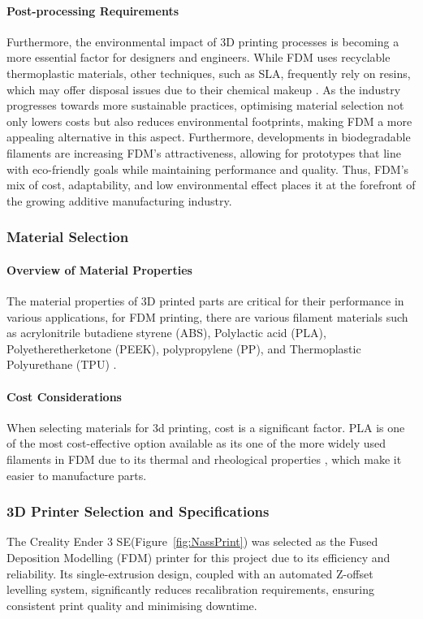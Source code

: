 \paragraph{Post-processing Requirements}

Furthermore, the environmental impact of 3D printing processes is becoming a more essential factor for designers and engineers. 
While FDM uses recyclable thermoplastic materials, other techniques, such as SLA, frequently rely on resins, which may offer disposal issues due to their chemical makeup \cite{RefWorks:yankov2017comparison}. 
As the industry progresses towards more sustainable practices, optimising material selection not only lowers costs but also reduces environmental footprints, making FDM a more appealing alternative in this aspect. 
Furthermore, developments in biodegradable filaments are increasing FDM's attractiveness, allowing for prototypes that line with eco-friendly goals while maintaining performance and quality. 
Thus, FDM's mix of cost, adaptability, and low environmental effect places it at the forefront of the growing additive manufacturing industry.

\subsubsection{Material Selection}
\paragraph{Overview of Material Properties}
The material properties of 3D printed parts are critical for their performance in various applications, for FDM printing, there are various filament materials such as acrylonitrile butadiene styrene (ABS), Polylactic acid (PLA), Polyetheretherketone (PEEK), polypropylene (PP), and Thermoplastic Polyurethane (TPU) \cite{RefWorks:RefID:89-rajan2022fused}.

\paragraph{Cost Considerations}

When selecting materials for 3d printing, cost is a significant factor. 
PLA is one of the most cost-effective option available as its one of the more widely used filaments in FDM due to its thermal and rheological properties \cite{RefWorks:RefID:89-rajan2022fused}, which make it easier to manufacture parts.

\subsubsection{3D Printer Selection and Specifications}
The Creality Ender 3 SE(Figure~\ref{fig:NassPrint}) was selected as the Fused Deposition Modelling (FDM) printer for this project due to its efficiency and reliability. 
Its single-extrusion design, coupled with an automated Z-offset levelling system, significantly reduces recalibration requirements, ensuring consistent print quality and minimising downtime. 

